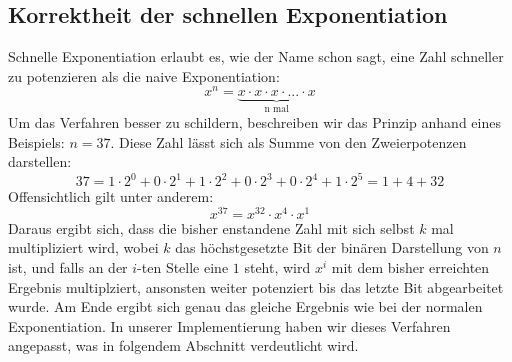 \documentclass[course=erap]{aspdoc}
\begin{document}
\subsection{Korrektheit der schnellen Exponentiation}%
Schnelle Exponentiation erlaubt es, wie der Name schon sagt, eine Zahl schneller zu potenzieren als die naive Exponentiation: \begin{equation}
x^n = \underbrace{x \cdot x \cdot x \cdot ... \cdot x}_\text{n mal}
\end{equation} 
Um das Verfahren besser zu schildern, beschreiben wir das Prinzip anhand eines Beispiels: $n = 37$. Diese Zahl lässt sich als Summe von den Zweierpotenzen darstellen:
\begin{equation}
 37 = 1 \cdot 2^0 + 0 \cdot 2^1 + 1 \cdot 2^2 + 0 \cdot 2^3 + 0 \cdot 2^4 + 1 \cdot 2^5 = 1 + 4 + 32
\end{equation}
Offensichtlich gilt unter anderem: 
\begin{equation}
    x^{37} = x^{32} \cdot x^4 \cdot x^1
\end{equation}
Daraus ergibt sich, dass die bisher enstandene Zahl mit sich selbst $k$ mal multipliziert wird, wobei $k$ das höchstgesetzte Bit der binären Darstellung von $n$ ist, und falls an der $i$-ten Stelle eine $1$ steht, wird $x^i$ mit dem bisher erreichten Ergebnis multiplziert, ansonsten weiter potenziert bis das letzte Bit abgearbeitet wurde. Am Ende ergibt sich genau das gleiche Ergebnis wie bei der normalen Exponentiation. In unserer Implementierung haben wir dieses Verfahren angepasst, was in folgendem Abschnitt verdeutlicht wird. 
\end{document}
